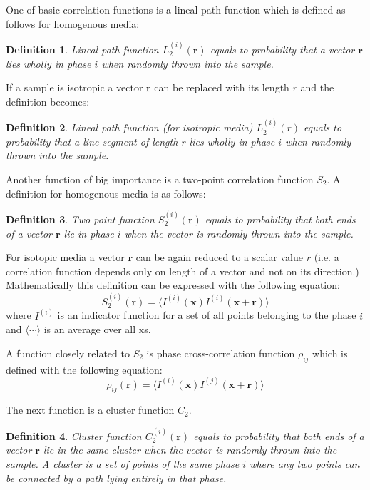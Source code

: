 \documentclass[reprint,amsmath,amssymb,aps,pre,showkeys,showpacs,nofootinbib]{revtex4-1}
\newtheorem{definition}{Definition}
\begin{document}
One of basic correlation functions is a lineal path function which is defined as
follows for homogenous media:
\begin{definition}
  Lineal path function $L_2^{(i)}(\bm{r})$ equals to probability that a
  vector $\bm{r}$ lies wholly in phase $i$ when randomly thrown into the
  sample.
\end{definition}
If a sample is isotropic a vector $\bm{r}$ can be replaced with its length
$r$ and the definition becomes:
\begin{definition}
  Lineal path function (for isotropic media) $L_2^{(i)}(r)$ equals to
  probability that a line segment of length $r$ lies wholly in phase $i$ when
  randomly thrown into the sample.
\end{definition}

Another function of big importance is a two-point correlation function $S_2$. A
definition for homogenous media is as follows:
\begin{definition}
  Two point function $S_2^{(i)}(\bm{r})$ equals to probability that both ends
  of a vector $\bm{r}$ lie in phase $i$ when the vector is randomly thrown
  into the sample.
\end{definition}
For isotopic media a vector $\bm{r}$ can be again reduced to a scalar value
$r$ (i.e. a correlation function depends only on length of a vector and not on
its direction.) Mathematically this definition can be expressed with the
following equation:
\begin{equation}
  S_2^{(i)}(\bm{r}) = \langle I^{(i)}(\bm{x}) I^{(i)}(\bm{x} +
  \bm{r}) \rangle
  \label{eq:s2-def}
\end{equation}
where $I^{(i)}$ is an indicator function for a set of all points belonging to
the phase $i$ and $\langle \cdots \rangle$ is an average over all xs.

A function closely related to $S_2$ is phase cross-correlation function
$\rho_{ij}$ which is defined with the following equation:
\begin{equation}
  \rho_{ij}(\bm{r}) = \langle I^{(i)}(\bm{x}) I^{(j)}(\bm{x} +
  \bm{r}) \rangle
  \label{eq:cross-def}
\end{equation}

The next function is a cluster function $C_2$.
\begin{definition}
  Cluster function $C_2^{(i)}(\bm{r})$ equals to probability that both
  ends of a vector $\bm{r}$ lie in the same cluster when the vector is
  randomly thrown into the sample. A cluster is a set of points of the same
  phase $i$ where any two points can be connected by a path lying entirely in
  that phase.
\end{definition}
\end{document}
